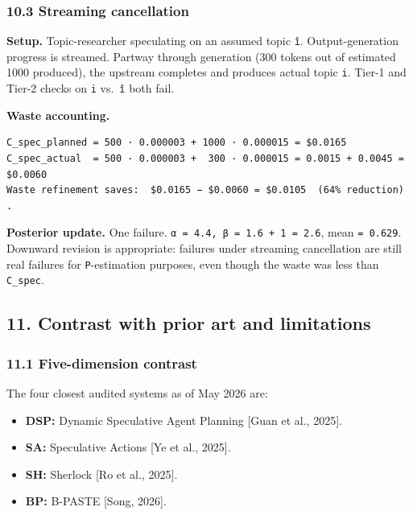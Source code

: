 \documentclass[
  11pt,
]{article}
\providecommand{\tightlist}{%
  \setlength{\itemsep}{0pt}\setlength{\parskip}{0pt}}
\begin{document}
\subsubsection{10.3 Streaming
cancellation}\label{streaming-cancellation}

\textbf{Setup.} Topic-researcher speculating on an assumed topic
\texttt{î}. Output-generation progress is streamed. Partway through
generation (300 tokens out of estimated 1000 produced), the upstream
completes and produces actual topic \texttt{i}. Tier-1 and Tier-2 checks
on \texttt{i} vs.~\texttt{î} both fail.

\textbf{Waste accounting.}

\begin{verbatim}
C_spec_planned = 500 · 0.000003 + 1000 · 0.000015 = $0.0165
C_spec_actual  = 500 · 0.000003 +  300 · 0.000015 = 0.0015 + 0.0045 = $0.0060
Waste refinement saves:  $0.0165 − $0.0060 = $0.0105  (64% reduction) .
\end{verbatim}

\textbf{Posterior update.} One failure.
\texttt{α\ =\ 4.4,\ β\ =\ 1.6\ +\ 1\ =\ 2.6}, mean \texttt{=\ 0.629}.
Downward revision is appropriate: failures under streaming cancellation
are still real failures for \texttt{P}-estimation purposes, even though
the waste was less than \texttt{C\_spec}.

\subsection{11. Contrast with prior art and
limitations}\label{contrast-with-prior-art-and-limitations}

\subsubsection{11.1 Five-dimension
contrast}\label{five-dimension-contrast}

The four closest audited systems as of May 2026 are:

\begin{itemize}
\tightlist
\item
  \textbf{DSP:} Dynamic Speculative Agent Planning {[}Guan et al.,
  2025{]}.
\item
  \textbf{SA:} Speculative Actions {[}Ye et al., 2025{]}.
\item
  \textbf{SH:} Sherlock {[}Ro et al., 2025{]}.
\item
  \textbf{BP:} B-PASTE {[}Song, 2026{]}.
\end{itemize}
\end{document}

